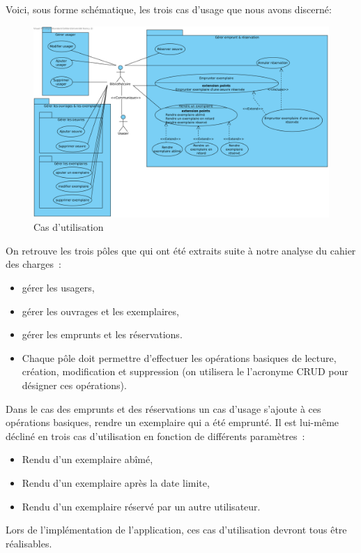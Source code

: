\documentclass[a4paper,12pt]{article}
\begin{document}
Voici, sous forme schématique, les trois cas d’usage que nous avons discerné:

\begin{figure}[htb]
\centering
\includegraphics[width=.9\linewidth]{./res/img/cas-d-utilisation.png}
\caption{\label{fig:orgparagraph1}
Cas d'utilisation}
\end{figure}


On retrouve les trois pôles que qui ont été extraits suite à notre analyse du cahier des charges :
\begin{itemize}
\item gérer les usagers,
\item gérer les ouvrages et les exemplaires,
\item gérer les emprunts et les réservations.
\item Chaque pôle doit permettre d’effectuer les opérations basiques de lecture, création, modification et
suppression (on utilisera le l'acronyme CRUD pour désigner ces opérations).
\end{itemize}


Dans le cas des emprunts et des réservations un cas d’usage s’ajoute à ces
opérations basiques, rendre un exemplaire qui a été emprunté. Il est lui-même
décliné en trois cas d’utilisation en fonction de différents paramètres :
\begin{itemize}
\item Rendu d’un exemplaire abîmé,
\item Rendu d’un exemplaire après la date limite,
\item Rendu d’un exemplaire réservé par un autre utilisateur.
\end{itemize}

Lors de l’implémentation de l’application, ces cas d’utilisation devront tous être réalisables.
\end{document}
